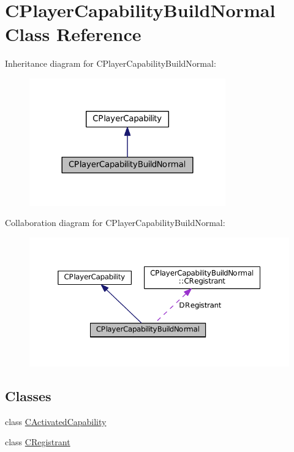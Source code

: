\hypertarget{classCPlayerCapabilityBuildNormal}{}\section{C\+Player\+Capability\+Build\+Normal Class Reference}
\label{classCPlayerCapabilityBuildNormal}


Inheritance diagram for C\+Player\+Capability\+Build\+Normal\+:
\nopagebreak
\begin{figure}[H]
\begin{center}
\leavevmode
\includegraphics[width=240pt]{classCPlayerCapabilityBuildNormal__inherit__graph}
\end{center}
\end{figure}


Collaboration diagram for C\+Player\+Capability\+Build\+Normal\+:
\nopagebreak
\begin{figure}[H]
\begin{center}
\leavevmode
\includegraphics[width=350pt]{classCPlayerCapabilityBuildNormal__coll__graph}
\end{center}
\end{figure}
\subsection*{Classes}
\begin{DoxyCompactItemize}
\item 
class \hyperlink{classCPlayerCapabilityBuildNormal_1_1CActivatedCapability}{C\+Activated\+Capability}
\item 
class \hyperlink{classCPlayerCapabilityBuildNormal_1_1CRegistrant}{C\+Registrant}
\end{DoxyCompactItemize}
